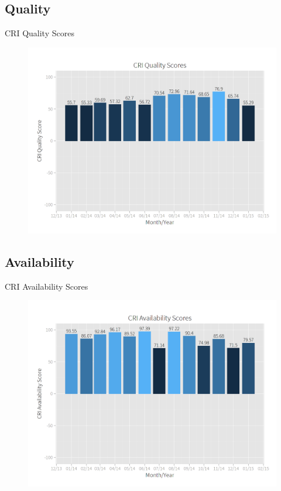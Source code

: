     \subsection{Quality}
        \begin{frame}{CRI Quality Scores}
            \begin{figure}
                \centering
                \includegraphics[scale=.23]{images/quality_scores.png}
            \end{figure}
        \end{frame}
    \subsection{Availability}
        \begin{frame}{CRI Availability Scores}
            \begin{figure}
                \centering
                \includegraphics[scale=.23]{images/availability_scores.png}
            \end{figure}
        \end{frame}
